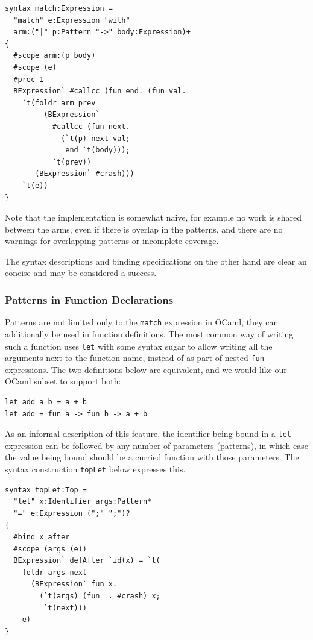 \documentclass{kththesis}
\begin{document}
\begin{verbatim}
syntax match:Expression =
  "match" e:Expression "with"
  arm:("|" p:Pattern "->" body:Expression)+
{
  #scope arm:(p body)
  #scope (e)
  #prec 1
  BExpression` #callcc (fun end. (fun val.
    `t(foldr arm prev
         (BExpression`
           #callcc (fun next.
             (`t(p) next val;
              end `t(body)));
           `t(prev))
       (BExpression` #crash)))
    `t(e))
}
\end{verbatim}

Note that the implementation is somewhat naive, for example no work is shared between the arms, even if there is overlap in the patterns, and there are no warnings for overlapping patterns or incomplete coverage.

The syntax descriptions and binding specifications on the other hand are clear an concise and may be considered a success.

\subsubsection{Patterns in Function Declarations}
\label{sec:ocaml-function-argument-patterns}

Patterns are not limited only to the \texttt{match} expression in OCaml, they can additionally be used in function definitions. The most common way of writing such a function uses \texttt{let} with some syntax sugar to allow writing all the arguments next to the function name, instead of as part of nested \texttt{fun} expressions. The two definitions below are equivalent, and we would like our OCaml subset to support both:

\begin{verbatim}
let add a b = a + b
let add = fun a -> fun b -> a + b
\end{verbatim}

As an informal description of this feature, the identifier being bound in a \texttt{let} expression can be followed by any number of parameters (patterns), in which case the value being bound should be a curried function with those parameters. The syntax construction \texttt{topLet} below expresses this.

\begin{verbatim}
syntax topLet:Top =
  "let" x:Identifier args:Pattern*
  "=" e:Expression (";" ";")?
{
  #bind x after
  #scope (args (e))
  BExpression` defAfter `id(x) = `t(
    foldr args next
      (BExpression` fun x.
        (`t(args) (fun _. #crash) x;
         `t(next)))
    e)
}
\end{verbatim}
\end{document}
